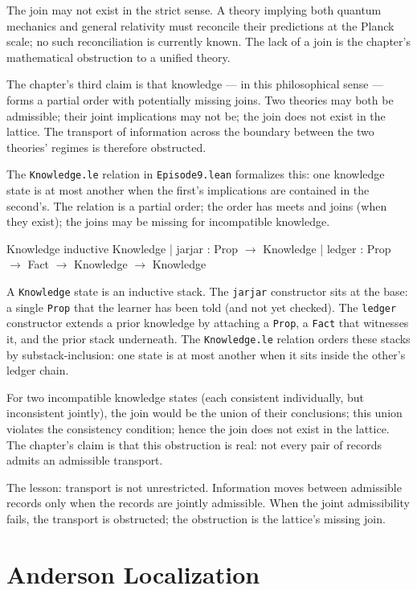 The join may not exist in the strict sense. A theory implying both
quantum mechanics and general relativity must reconcile their
predictions at the Planck scale; no such reconciliation is
currently known. The lack of a join is the chapter's
mathematical obstruction to a unified theory.

The chapter's third claim is that knowledge --- in this
philosophical sense --- forms a partial order with potentially
missing joins. Two theories may both be admissible; their joint
implications may not be; the join does not exist in the lattice.
The transport of information across the boundary between the two
theories' regimes is therefore obstructed.

The \texttt{Knowledge.le} relation in \texttt{Episode9.lean}
formalizes this: one knowledge state is at most another when the
first's implications are contained in the second's. The relation
is a partial order; the order has meets and joins (when they
exist); the joins may be missing for incompatible knowledge.

\begin{leanexcerpt}{Knowledge}
inductive Knowledge
  | jarjar : Prop $\to$ Knowledge
  | ledger : Prop $\to$ Fact $\to$ Knowledge $\to$ Knowledge
\end{leanexcerpt}

A \texttt{Knowledge} state is an inductive stack. The
\texttt{jarjar} constructor sits at the base: a single
\texttt{Prop} that the learner has been told (and not yet
checked). The \texttt{ledger} constructor extends a prior
knowledge by attaching a \texttt{Prop}, a \texttt{Fact} that
witnesses it, and the prior stack underneath. The
\texttt{Knowledge.le} relation orders these stacks by
substack-inclusion: one state is at most another when it sits
inside the other's ledger chain.

For two incompatible knowledge states (each consistent
individually, but inconsistent jointly), the join would be the
union of their conclusions; this union violates the consistency
condition; hence the join does not exist in the lattice. The
chapter's claim is that this obstruction is real: not every
pair of records admits an admissible transport.

The lesson: transport is not unrestricted. Information moves
between admissible records only when the records are jointly
admissible. When the joint admissibility fails, the transport is
obstructed; the obstruction is the lattice's missing join.

\section{Anderson Localization}
\label{se:anderson-localization}

